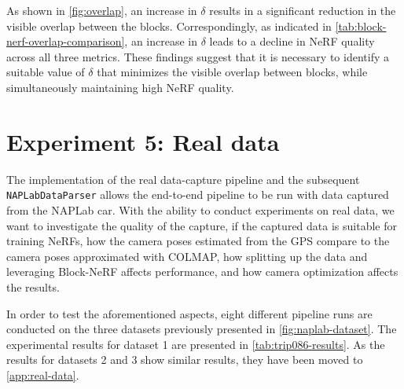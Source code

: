 


As shown in \autoref{fig:overlap}, an increase in $\delta$ results in a significant reduction in the visible overlap between the blocks. Correspondingly, as indicated in \autoref{tab:block-nerf-overlap-comparison}, an increase in $\delta$ leads to a decline in NeRF quality across all three metrics. These findings suggest that it is necessary to identify a suitable value of $\delta$ that minimizes the visible overlap between blocks, while simultaneously maintaining high NeRF quality.
















\section{Experiment 5: Real data}
The implementation of the real data-capture pipeline and the subsequent \texttt{NAPLabDataParser} allows the end-to-end pipeline to be run with data captured from the NAPLab car. With the ability to conduct experiments on real data, we want to investigate the quality of the capture, if the captured data is suitable for training NeRFs, how the camera poses estimated from the GPS compare to the camera poses approximated with COLMAP, how splitting up the data and leveraging Block-NeRF affects performance, and how camera optimization affects the results.

In order to test the aforementioned aspects, eight different pipeline runs are conducted on the three datasets previously presented in \autoref{fig:naplab-dataset}. The experimental results for dataset 1 are presented in \autoref{tab:trip086-results}. As the results for datasets 2 and 3 show similar results, they have been moved to \autoref{app:real-data}.

